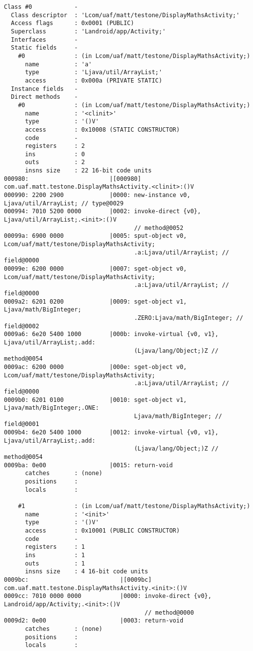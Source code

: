 \begin{lstlisting}
Class #0            -
  Class descriptor  : 'Lcom/uaf/matt/testone/DisplayMathsActivity;'
  Access flags      : 0x0001 (PUBLIC)
  Superclass        : 'Landroid/app/Activity;'
  Interfaces        -
  Static fields     -
    #0              : (in Lcom/uaf/matt/testone/DisplayMathsActivity;)
      name          : 'a'
      type          : 'Ljava/util/ArrayList;'
      access        : 0x000a (PRIVATE STATIC)
  Instance fields   -
  Direct methods    -
    #0              : (in Lcom/uaf/matt/testone/DisplayMathsActivity;)
      name          : '<clinit>'
      type          : '()V'
      access        : 0x10008 (STATIC CONSTRUCTOR)
      code          -
      registers     : 2
      ins           : 0
      outs          : 2
      insns size    : 22 16-bit code units
000980:                       |[000980] com.uaf.matt.testone.DisplayMathsActivity.<clinit>:()V
000990: 2200 2900             |0000: new-instance v0, Ljava/util/ArrayList; // type@0029
000994: 7010 5200 0000        |0002: invoke-direct {v0}, Ljava/util/ArrayList;.<init>:()V
                                     // method@0052
00099a: 6900 0000             |0005: sput-object v0, Lcom/uaf/matt/testone/DisplayMathsActivity;
                                     .a:Ljava/util/ArrayList; // field@0000
00099e: 6200 0000             |0007: sget-object v0, Lcom/uaf/matt/testone/DisplayMathsActivity;
                                     .a:Ljava/util/ArrayList; // field@0000
0009a2: 6201 0200             |0009: sget-object v1, Ljava/math/BigInteger;
                                     .ZERO:Ljava/math/BigInteger; // field@0002
0009a6: 6e20 5400 1000        |000b: invoke-virtual {v0, v1}, Ljava/util/ArrayList;.add:
                                     (Ljava/lang/Object;)Z // method@0054
0009ac: 6200 0000             |000e: sget-object v0, Lcom/uaf/matt/testone/DisplayMathsActivity;
                                     .a:Ljava/util/ArrayList; // field@0000
0009b0: 6201 0100             |0010: sget-object v1, Ljava/math/BigInteger;.ONE:
                                     Ljava/math/BigInteger; // field@0001
0009b4: 6e20 5400 1000        |0012: invoke-virtual {v0, v1}, Ljava/util/ArrayList;.add:
                                     (Ljava/lang/Object;)Z // method@0054
0009ba: 0e00                  |0015: return-void
      catches       : (none)
      positions     :
      locals        :

    #1              : (in Lcom/uaf/matt/testone/DisplayMathsActivity;)
      name          : '<init>'
      type          : '()V'
      access        : 0x10001 (PUBLIC CONSTRUCTOR)
      code          -
      registers     : 1
      ins           : 1
      outs          : 1
      insns size    : 4 16-bit code units
0009bc:                          |[0009bc] com.uaf.matt.testone.DisplayMathsActivity.<init>:()V
0009cc: 7010 0000 0000           |0000: invoke-direct {v0}, Landroid/app/Activity;.<init>:()V
                                        // method@0000
0009d2: 0e00                     |0003: return-void
      catches       : (none)
      positions     :
      locals        :


\end{lstlisting}
